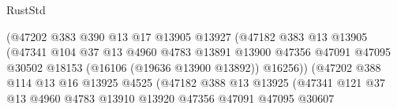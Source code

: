\begin{lexlean}{RustStd}
\begin{coremodule}
                                          (@47202
                                            @383
                                            @390
                                            @13
                                            @17
                                            @13905
                                            @13927
                                            (@47182
                                              @383
                                              @13
                                              @13905
                                              (@47341
                                                @104
                                                @37
                                                @13
                                                @4960
                                                @4783
                                                @13891
                                                @13900
                                                @47356
                                                @47091
                                                @47095
                                                @30502
                                                @18153
                                                (@16106 (@19636 @13900 @13892))
                                                @16256))
                                            (@47202
                                              @388
                                              @114
                                              @13
                                              @16
                                              @13925
                                              @4525
                                              (@47182
                                                @388
                                                @13
                                                @13925
                                                (@47341
                                                  @121
                                                  @37
                                                  @13
                                                  @4960
                                                  @4783
                                                  @13910
                                                  @13920
                                                  @47356
                                                  @47091
                                                  @47095
                                                  @30607

\end{coremodule}
\end{lexlean}
